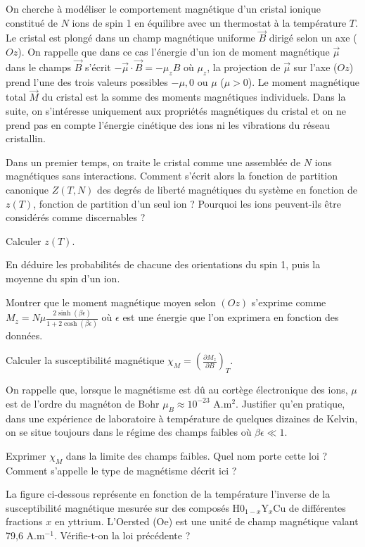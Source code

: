 On cherche à modéliser le comportement magnétique d’un cristal ionique constitué de $N$ ions
de spin 1 en équilibre avec un thermostat à la température $T$. Le cristal est plongé dans un champ
magnétique uniforme $\Vec{B}$ dirigé selon un axe ($Oz$). On rappelle que dans ce cas l'énergie d'un ion
de moment magnétique $\Vec{\mu}$  dans le champs $\Vec{B}$ s’écrit $-\Vec{\mu} \cdot \Vec{B}= - \mu_z B$ où $\mu_z$, la projection de
$\Vec{\mu}$ sur l’axe ($Oz$) prend l’une des trois valeurs possibles $ - \mu, 0$ ou $\mu$ ($\mu >0$). Le moment magnétique total $\Vec{M}$ du cristal est la somme des moments magnétiques individuels. Dans la suite, on s’intéresse uniquement aux propriétés magnétiques
du cristal et on ne prend pas en compte l'énergie cinétique des ions ni les vibrations du réseau cristallin.


Dans un premier temps, on traite le cristal comme une assemblée de $N$ ions magnétiques sans interactions.
\question  Comment s'écrit alors la fonction de partition canonique $Z(T, N)$  des degrés de liberté magnétiques du système en fonction de $z(T)$, fonction de partition d’un seul ion ?
Pourquoi les ions peuvent-ils être considérés comme discernables ?

\question Calculer $z(T)$.

\question En déduire les probabilités de chacune des orientations du spin 1, puis la moyenne du spin d'un ion.

\question Montrer que le moment magnétique moyen selon $(Oz)$ s'exprime comme $M_z=N\mu \frac{2 \sinh{(\beta \epsilon)}}{1+2 \cosh{(\beta \epsilon)}}$ où $\epsilon$ est une énergie que l'on exprimera en fonction des données.

\question Calculer la susceptibilité magnétique $\chi_M=\left( \frac{\partial M_z}{\partial B}\right)_T$.

\question On rappelle que, lorsque le magnétisme est dû au cortège électronique des ions, $\mu$ est de
l'ordre du magnéton de Bohr $\mu_B \approx 10^{-23}$ A.m$^2$. Justifier qu'en pratique, dans une expérience de laboratoire
à température de quelques dizaines de Kelvin, on se situe toujours dans le régime des champs faibles où $\beta \epsilon \ll 1$.

\question Exprimer $\chi_M$ dans la limite des champs faibles. Quel nom porte cette loi ? Comment s'appelle le
type de magnétisme décrit ici ?

\question La figure ci-dessous représente en fonction de la température l'inverse de la susceptibilité magnétique 
mesurée sur des composés H0$_{1-x}$Y$_x$Cu de différentes fractions $x$ en yttrium. L’Oersted (Oe) est une unité de champ magnétique valant 79,6 A.m$^{-1}$. Vérifie-t-on la loi précédente ?


